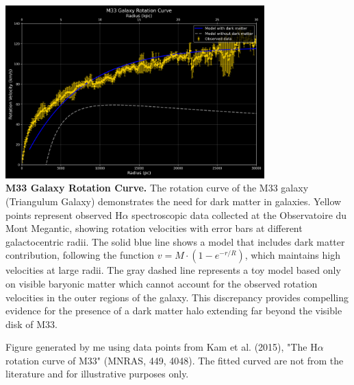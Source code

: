 \begin{center}
\includegraphics[width=0.75\textwidth]{37_DarkMatterEvidence/m33_rotation_curve.png}    \\
\textbf{M33 Galaxy Rotation Curve.} The rotation curve of the M33 galaxy (Triangulum Galaxy) demonstrates the need for dark matter in galaxies. Yellow points represent observed H$\alpha$ spectroscopic data collected at the Observatoire du Mont Megantic, showing rotation velocities with error bars at different galactocentric radii. The solid blue line shows a model that includes dark matter contribution, following the function $v = M \cdot (1 - e^{-r/R})$, which maintains high velocities at large radii. The gray dashed line represents a toy model based only on visible baryonic matter which cannot account for the observed rotation velocities in the outer regions of the galaxy. This discrepancy provides compelling evidence for the presence of a dark matter halo extending far beyond the visible disk of M33.

\vspace{0.5em}
\small{Figure generated by me using data points from Kam et al. (2015), "The H$\alpha$ rotation curve of M33" (MNRAS, 449, 4048). The fitted curved are not from the literature and for illustrative purposes only.}
\end{center}
